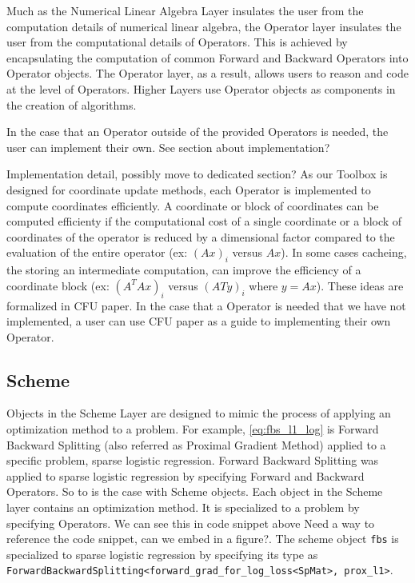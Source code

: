 Much as the Numerical Linear Algebra Layer insulates the user from the computation details of numerical linear algebra, the Operator layer insulates the user from the computational details of Operators. This is achieved by encapsulating the computation of common Forward and Backward Operators into Operator objects. The Operator layer, as a result, allows users to reason and code at the level of Operators. Higher Layers use Operator objects as components in the creation of algorithms.

In the case that an Operator outside of the provided Operators is needed, the user can implement their own. See section about implementation?
 
{\color{red} Implementation detail, possibly move to dedicated section?} As our Toolbox is designed for coordinate update methods, each Operator is implemented to compute coordinates efficiently. A coordinate or block of coordinates can be computed efficienty if the computational cost of a single coordinate or a block of coordinates of the operator is reduced by a dimensional factor compared to the evaluation of the entire operator (ex: $(Ax)_i$ versus $Ax$). In some cases cacheing, the storing an intermediate computation, can improve the efficiency of a coordinate block (ex: $(A^TAx)_i$ versus $(ATy)_i$ where $y=Ax$). These ideas are formalized in CFU paper.  In the case that a Operator is needed that we have not implemented, a user can use CFU paper as a guide to  implementing their own Operator.
 

\subsection{Scheme}

Objects in the Scheme Layer are designed to mimic the process of applying an optimization method to a problem.
For example, \eqref{eq:fbs_l1_log} is Forward Backward Splitting (also referred as Proximal Gradient Method) applied to a specific problem, sparse logistic regression.
Forward Backward Splitting was applied to sparse logistic regression by specifying Forward and Backward Operators.
So to is the case with Scheme objects.
Each object in the Scheme layer contains an optimization method.
It is specialized to a problem by specifying Operators. We can see this in code snippet above {\color{red} Need a way to reference the code snippet, can we embed in a figure?}.
The scheme object \texttt{fbs} is specialized to sparse logistic regression by specifying its type as \texttt{ForwardBackwardSplitting<forward\_grad\_for\_log\_loss<SpMat>, prox\_l1>}.
  
